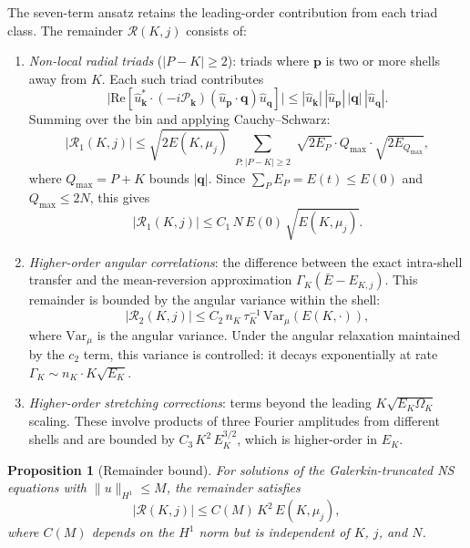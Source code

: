 \documentclass[11pt,a4paper]{article}
\newtheorem{proposition}[theorem]{Proposition}
\theoremstyle{remark}
\begin{document}
The seven-term ansatz retains the leading-order contribution from each triad class.  The remainder $\mathcal{R}(K, j)$ consists of:
\begin{enumerate}
\item \emph{Non-local radial triads} ($|P - K| \geq 2$): triads where $\mathbf{p}$ is two or more shells away from $K$.  Each such triad contributes
\[
  \bigl|\mathrm{Re}[\hat{u}_{\mathbf{k}}^* \cdot (-i\mathcal{P}_{\mathbf{k}})(\hat{u}_{\mathbf{p}} \cdot \mathbf{q})\hat{u}_{\mathbf{q}}]\bigr| \leq |\hat{u}_{\mathbf{k}}|\, |\hat{u}_{\mathbf{p}}|\, |\mathbf{q}|\, |\hat{u}_{\mathbf{q}}|.
\]
Summing over the bin and applying Cauchy--Schwarz:
\[
  |\mathcal{R}_1(K,j)| \leq \sqrt{2E(K,\mu_j)} \sum_{\substack{P : |P-K| \geq 2}} \sqrt{2E_P} \cdot Q_{\max} \cdot \sqrt{2E_{Q_{\max}}},
\]
where $Q_{\max} = P + K$ bounds $|\mathbf{q}|$.  Since $\sum_P E_P = E(t) \leq E(0)$ and $Q_{\max} \leq 2N$, this gives
\[
  |\mathcal{R}_1(K,j)| \leq C_1\, N\, E(0)\, \sqrt{E(K,\mu_j)}.
\]

\item \emph{Higher-order angular correlations}: the difference between the exact intra-shell transfer and the mean-reversion approximation $\Gamma_K(\bar{E} - E_{K,j})$.  This remainder is bounded by the angular variance within the shell:
\[
  |\mathcal{R}_2(K,j)| \leq C_2\, n_K\, \tau_K^{-1}\, \mathrm{Var}_\mu(E(K,\cdot)),
\]
where $\mathrm{Var}_\mu$ is the angular variance.  Under the angular relaxation maintained by the $c_2$ term, this variance is controlled: it decays exponentially at rate $\Gamma_K \sim n_K \cdot K\sqrt{E_K}$.

\item \emph{Higher-order stretching corrections}: terms beyond the leading $K\sqrt{E_K\Omega_K}$ scaling.  These involve products of three Fourier amplitudes from different shells and are bounded by $C_3\, K^2\, E_K^{3/2}$, which is higher-order in $E_K$.
\end{enumerate}

\begin{proposition}[Remainder bound]\label{prop:remainder}
For solutions of the Galerkin-truncated NS equations with $\|u\|_{H^1} \leq M$, the remainder satisfies
\[
  |\mathcal{R}(K,j)| \leq C(M)\, K^2\, E(K,\mu_j),
\]
where $C(M)$ depends on the $H^1$ norm but is independent of $K$, $j$, and $N$.
\end{proposition}
\end{document}
